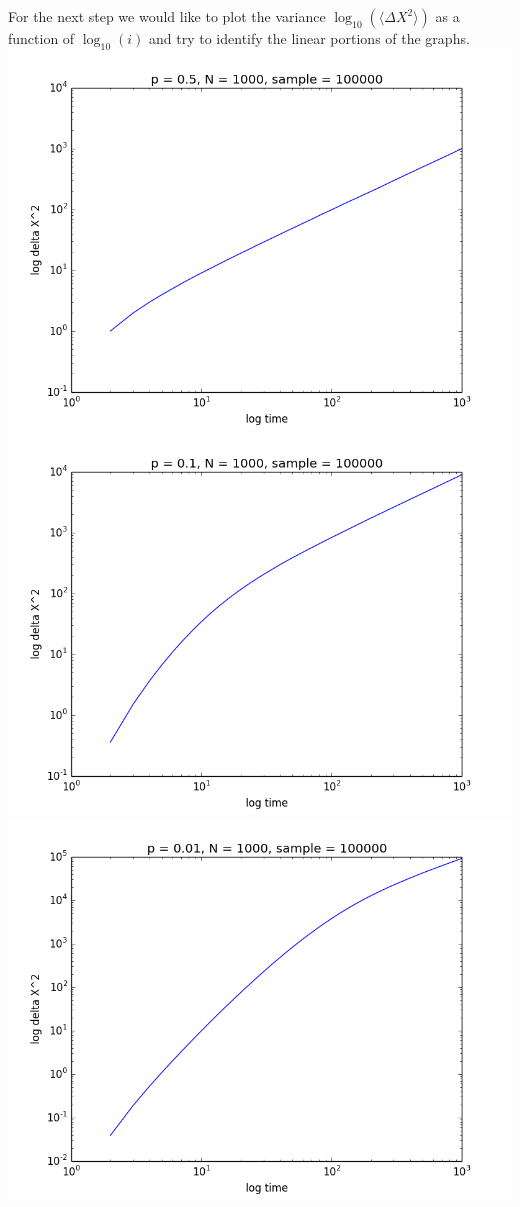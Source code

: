 \documentclass{article}
\begin{document}
\begin{enumerate}[I]
For the next step we would like to plot the variance $\log_{10}(\langle\Delta X^2\rangle)$ as a function of $\log_{10}(i)$ and try to identify the linear portions of the graphs.\\
\hspace{-4cm}
\includegraphics[scale=0.3]{05log.png}
\includegraphics[scale=0.3]{01log.png}
\includegraphics[scale=0.3]{001log.png}

\end{enumerate}
\end{document}
